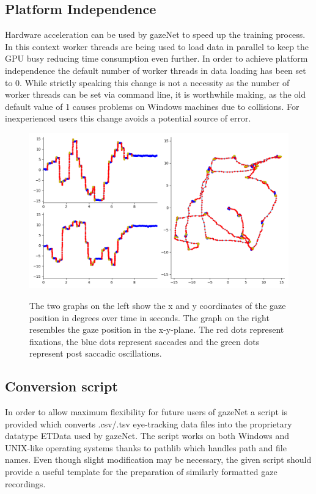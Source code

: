 \documentclass[conference]{IEEEtran}
\begin{document}
\subsection{Platform Independence}
Hardware acceleration can be used by gazeNet to speed up the training process. In this context worker threads are being used to load data in parallel to keep the GPU busy reducing time consumption even further. In order to achieve platform independence the default number of worker threads in data loading has been set to 0. While strictly speaking this change is not a necessity as the number of worker threads can be set via command line, it is worthwhile making, as the old default value of 1 causes problems on Windows machines due to collisions. For inexperienced users this change avoids a potential source of error.

\begin{figure}
    \centering
    \includegraphics[width=0.7\linewidth]
    {TH34_img_Europe_labelled_MN}
    \label{fig:lund2013}
    \caption{The two graphs on the left show the x and y coordinates of the gaze position in degrees over time in seconds. The graph on the right resembles the gaze position in the x-y-plane. The red dots represent fixations, the blue dots represent saccades and the green dots represent post saccadic oscillations.}
\end{figure}

\subsection{Conversion script}
In order to allow maximum flexibility for future users of gazeNet a script is provided which converts .csv/.tsv eye-tracking data files into the proprietary datatype ETData used by gazeNet. The script works on both Windows and UNIX-like operating systems thanks to pathlib which handles path and file names. Even though slight modification may be necessary, the given script should provide a useful template for the preparation of similarly formatted gaze recordings.
\end{document}
